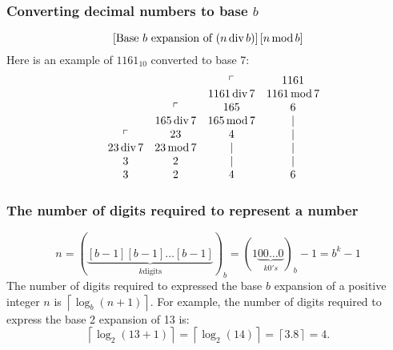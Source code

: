 \subsubsection*{Converting decimal numbers to base $b$}
\[
    \left[\text{Base $b$ expansion of $(n \operatorname{\text{div}} b)$}\right]\left[n \operatorname{\text{mod}} b\right]
\]
Here is an example of $1161_{10}$ converted to base 7:
\[
    \begin{array}{ccccc}
         &            &             & \ulcorner    & 1161         \\
         &            &             & 1161 \operatorname{\text{div}} 7 & 1161 \operatorname{\text{mod}} 7 \\
         &            & \ulcorner   & 165          & 6            \\
         &            & 165 \operatorname{\text{div}} 7 & 165 \operatorname{\text{mod}} 7  & |            \\
         & \ulcorner  & 23          & 4            & |            \\
         & 23 \operatorname{\text{div}} 7 & 23 \operatorname{\text{mod}} 7  & |            & |            \\
         & 3          & 2           & |            & |            \\
         & 3          & 2           & 4            & 6            \\
    \end{array}
\]

\subsubsection*{The number of digits required to represent a number}
\[
    n = (\underbrace{[b-1][b-1]\ldots[b-1]}_{k \text{digits}})_b = (1\underbrace{00\ldots 0}_{k 0's})_b -1 = b^k - 1
\]
The number of digits required to expressed the base $b$ expansion of a positive integer $n$ is $\left\lceil \log_b (n+1) \right\rceil$. For example, the number of digits required to express the base 2 expansion of 13 is:
\[
    \left\lceil\log_2 (13 + 1)\right\rceil = \left\lceil \log_2(14)\right\rceil = \left\lceil 3.8 \right\rceil = 4.
\]

